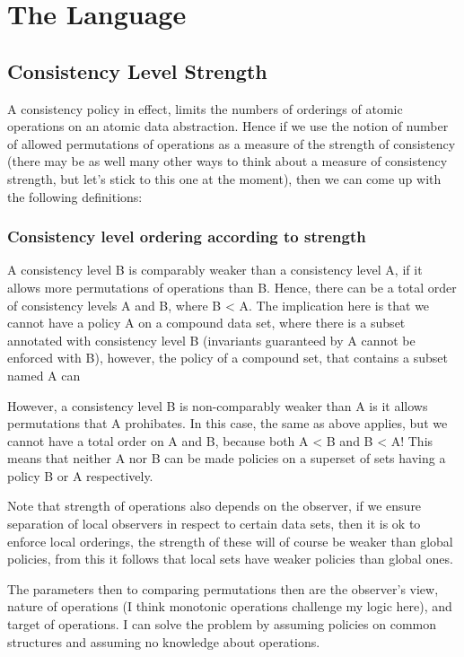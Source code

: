 

\section{The  Language}
\subsection{Consistency Level Strength}
A consistency policy in effect, limits the numbers of orderings of atomic
operations on an atomic data abstraction. Hence if we use the notion of number
of allowed permutations of operations as a measure of the strength of
consistency (there may be as well many other ways to think about a measure of
consistency strength, but let's stick to this one at the moment), then we can
come up with the following definitions:

\subsubsection{Consistency level ordering according to strength}
A consistency level B is comparably weaker than a consistency level A, if it
allows more permutations of operations than B. Hence, there can be a total order
of consistency levels A and B, where B < A. The implication here is that we
cannot have a policy A on a compound data set, where there is a subset annotated
with consistency level B (invariants guaranteed by A cannot be enforced with B),
however, the policy of a compound set, that contains a subset named A can 

However, a consistency level B is non-comparably weaker than A is it allows
permutations that A prohibates. In this case, the same as above applies, but we
cannot have a total order on A and B, because both A < B and B < A! This means
that neither A nor B can be made policies on a superset of sets having a policy
B or A respectively. 

Note that strength of operations also depends on the observer, if we ensure
separation of local observers in respect to certain data sets, then it is ok to
enforce local orderings, the strength of these will of course be weaker than
global policies, from this it follows that local sets have weaker policies than
global ones.

The parameters then to comparing permutations then are the observer's view,
nature of operations (I think monotonic operations challenge my logic here), and
target of operations. I can solve the problem by assuming policies on common
structures and assuming no knowledge about operations. 

